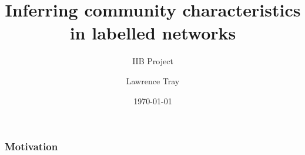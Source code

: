 \documentclass{beamer}
\title{Inferring community characteristics in labelled networks}
\subtitle{IIB Project}
\author{Lawrence Tray}
\institute{St John's College}
\date{\today}
\begin{document}
	
	\begin{frame}
		\titlepage
	\end{frame}

	\begin{frame}
		\frametitle{Motivation}
	\end{frame}
\end{document}
